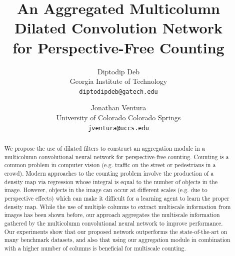 \documentclass[10pt,twocolumn,letterpaper]{article}
\begin{document}
\title{An Aggregated Multicolumn Dilated Convolution Network\\ for Perspective-Free Counting}

\author{Diptodip Deb \\
Georgia Institute of Technology\\
{\tt\small diptodipdeb@gatech.edu}
\and
Jonathan Ventura \\
University of Colorado Colorado Springs\\
{\tt\small jventura@uccs.edu}
}

\maketitle

\begin{abstract}
We propose the use of dilated filters to construct an aggregation module in a multicolumn convolutional neural network for perspective-free counting. Counting is a common problem in computer vision (e.g. traffic on the street or pedestrians in a crowd). Modern approaches to the counting problem involve the production of a density map via regression whose integral is equal to the number of objects in the image. However, objects in the image can occur at different scales (e.g. due to perspective effects) which can make it difficult for a learning agent to learn the proper density map. While the use of multiple columns to extract multiscale information from images has been shown before, our approach aggregates the multiscale information gathered by the multicolumn convolutional neural network to improve performance. Our experiments show that our proposed network outperforms the state-of-the-art on many benchmark datasets, and also that using our aggregation module in combination with a higher number of columns is beneficial for multiscale counting.
\end{abstract}

\end{document}
